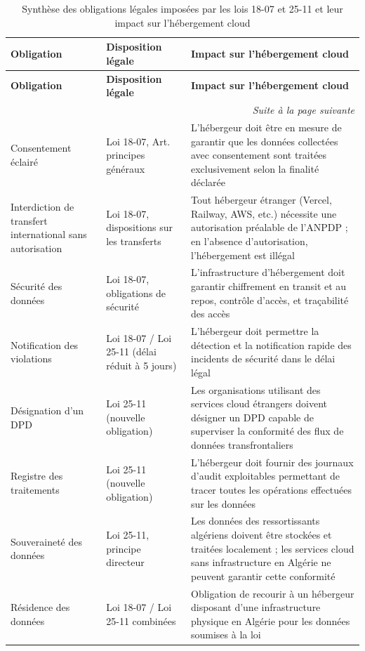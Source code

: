 \begin{longtable}{|p{3cm}|p{4.5cm}|p{5.5cm}|}
\caption{Synthèse des obligations légales imposées par les lois 18-07 et 25-11 et leur impact sur l'hébergement cloud}
\label{tab:obligations-legales} \\

\hline
\textbf{Obligation} & \textbf{Disposition légale} & \textbf{Impact sur l'hébergement cloud} \\
\hline
\endfirsthead

\hline
\textbf{Obligation} & \textbf{Disposition légale} & \textbf{Impact sur l'hébergement cloud} \\
\hline
\endhead

\hline
\multicolumn{3}{r|}{\small\textit{Suite à la page suivante}} \\
\endfoot

\hline
\endlastfoot

Consentement éclairé
  & Loi 18-07, Art. principes généraux
  & L'hébergeur doit être en mesure de garantir que les données collectées avec consentement sont traitées exclusivement selon la finalité déclarée \\
\hline
Interdiction de transfert international sans autorisation
  & Loi 18-07, dispositions sur les transferts
  & Tout hébergeur étranger (Vercel, Railway, AWS, etc.) nécessite une autorisation préalable de l'ANPDP ; en l'absence d'autorisation, l'hébergement est illégal \\
\hline
Sécurité des données
  & Loi 18-07, obligations de sécurité
  & L'infrastructure d'hébergement doit garantir chiffrement en transit et au repos, contrôle d'accès, et traçabilité des accès \\
\hline
Notification des violations
  & Loi 18-07 / Loi 25-11 (délai réduit à 5 jours)
  & L'hébergeur doit permettre la détection et la notification rapide des incidents de sécurité dans le délai légal \\
\hline
Désignation d'un DPD
  & Loi 25-11 (nouvelle obligation)
  & Les organisations utilisant des services cloud étrangers doivent désigner un DPD capable de superviser la conformité des flux de données transfrontaliers \\
\hline
Registre des traitements
  & Loi 25-11 (nouvelle obligation)
  & L'hébergeur doit fournir des journaux d'audit exploitables permettant de tracer toutes les opérations effectuées sur les données \\
\hline
Souveraineté des données
  & Loi 25-11, principe directeur
  & Les données des ressortissants algériens doivent être stockées et traitées localement ; les services cloud sans infrastructure en Algérie ne peuvent garantir cette conformité \\
\hline
Résidence des données
  & Loi 18-07 / Loi 25-11 combinées
  & Obligation de recourir à un hébergeur disposant d'une infrastructure physique en Algérie pour les données soumises à la loi \\
\hline

\end{longtable}

